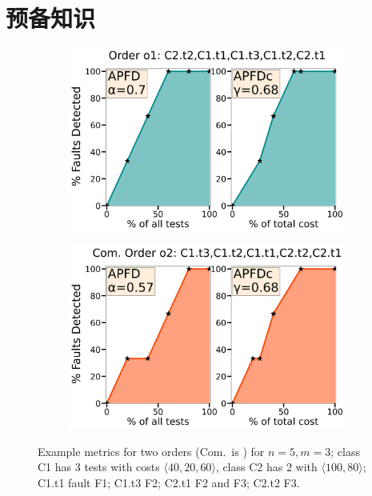 \chapter{预备知识}\label{sec:preliminaries}
\begin{figure}[t]
    \centering
	\begin{subfigure}[b]{0.48\linewidth}
		\centering
		\includegraphics[width=\textwidth]{figures/5-1-3-2-4.png}
	\end{subfigure}
	\hfill
	\begin{subfigure}[b]{0.48\linewidth}
		\centering
		\includegraphics[width=\textwidth]{figures/3-2-1-5-4.png}
	\end{subfigure}
	\vspace{-1em}
	\caption{Example metrics for two orders (Com.\ is \compatible) for $n=5,m=3$; class C1 has 3 tests with costs $\langle40,20,60\rangle$, class C2 has 2 with $\langle100,80\rangle$; C1.t1 \detects fault F1; C1.t3 \detects F2; C2.t1 \detects F2 and F3; C2.t2 \detects F3.\label{fig:example}}
	\vspace{-0.2in}
\end{figure}

